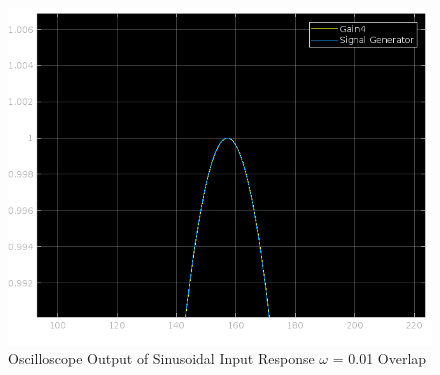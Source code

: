 \documentclass[12pt]{article}
\begin{document}
			\begin{figure}[H]
				\centering
				\includegraphics[width=1\linewidth]{"Code/Fig/sine_input_output_w_0_01_zoom.png"}
				\caption{Oscilloscope Output of Sinusoidal Input Response $\omega$ = 0.01 Overlap}
				\label{fig:sineinputoutputw001zoom}
			\end{figure}
				
\end{document}
